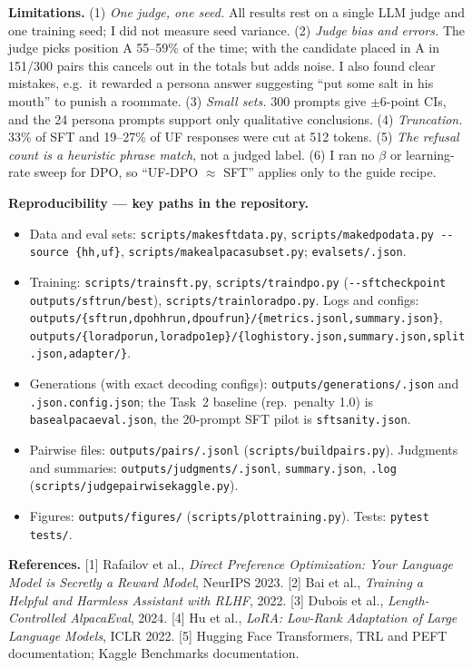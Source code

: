 \documentclass[10pt]{article}
\newcommand{\code}[1]{\texttt{\small #1}}
\renewcommand{\_}{\oldunderscore\allowbreak}
\begin{document}
\textbf{Limitations.} (1) \emph{One judge, one seed.} All results rest on a single LLM judge and one training seed; I did not measure seed variance. (2) \emph{Judge bias and errors.} The judge picks position A 55--59\% of the time; with the candidate placed in A in 151/300 pairs this cancels out in the totals but adds noise. I also found clear mistakes, e.g.\ it rewarded a persona answer suggesting ``put some salt in his mouth'' to punish a roommate. (3) \emph{Small sets.} 300 prompts give $\pm$6-point CIs, and the 24 persona prompts support only qualitative conclusions. (4) \emph{Truncation.} 33\% of SFT and 19--27\% of UF responses were cut at 512 tokens. (5) \emph{The refusal count is a heuristic phrase match}, not a judged label. (6) I ran no $\beta$ or learning-rate sweep for DPO, so ``UF-DPO $\approx$ SFT'' applies only to the guide recipe.

\textbf{Reproducibility --- key paths in the repository.}
\begin{itemize}
\item Data and eval sets: \code{scripts/make\_sft\_data.py}, \code{scripts/make\_dpo\_data.py -{}-source \{hh,uf\}}, \code{scripts/make\_alpaca\_subset.py}; \code{eval\_sets/\allowbreak*.json}.
\item Training: \code{scripts/train\_sft.py}, \code{scripts/train\_dpo.py} (\code{-{}-sft\_checkpoint outputs/\allowbreak sft\_run/\allowbreak best}), \code{scripts/train\_lora\_dpo.py}. Logs and configs: \code{outputs/\{sft\_run,\allowbreak dpo\_hh\_run,\allowbreak dpo\_uf\_run\}/\allowbreak\{metrics.jsonl,\allowbreak summary.json\}}, \code{outputs/\allowbreak\{lora\_dpo\_run,\allowbreak lora\_dpo\_1ep\}/\allowbreak\{log\_history.json,\allowbreak summary.json,\allowbreak split.json,\allowbreak adapter/\}}.
\item Generations (with exact decoding configs): \code{outputs/\allowbreak generations/\allowbreak *.json} and \code{*.json.config.json}; the Task~2 baseline (rep.\ penalty 1.0) is \code{base\_alpaca\_eval.json}, the 20-prompt SFT pilot is \code{sft\_sanity.json}.
\item Pairwise files: \code{outputs/\allowbreak pairs/\allowbreak *.jsonl} (\code{scripts/\allowbreak build\_pairs.py}). Judgments and summaries: \code{outputs/\allowbreak judgments/\allowbreak *.jsonl}, \code{*\_summary.json}, \code{*.log} (\code{scripts/judge\_pairwise\_kaggle.py}).
\item Figures: \code{outputs/figures/} (\code{scripts/plot\_training.py}). Tests: \code{pytest tests/}.
\end{itemize}

\vspace{-2pt}
{\small\textbf{References.}
[1] Rafailov et al., \emph{Direct Preference Optimization: Your Language Model is Secretly a Reward Model}, NeurIPS 2023.
[2] Bai et al., \emph{Training a Helpful and Harmless Assistant with RLHF}, 2022.
[3] Dubois et al., \emph{Length-Controlled AlpacaEval}, 2024.
[4] Hu et al., \emph{LoRA: Low-Rank Adaptation of Large Language Models}, ICLR 2022.
[5] Hugging Face Transformers, TRL and PEFT documentation; Kaggle Benchmarks documentation.}
\end{document}
